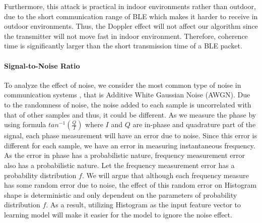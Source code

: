 Furthermore, this attack is practical in indoor environments rather than outdoor, due to the short communication range of BLE which makes it harder to receive in outdoor environments. Thus, the Doppler effect will not affect our algorithm since the transmitter will not move fast in indoor environment. Therefore, coherence time is significantly larger than the short transmission time of a BLE packet.

\paragraph{Signal-to-Noise Ratio} To analyze the effect of noise, we consider the most common type of noise in communication systems , that is Additive White Gaussian Noise (AWGN). Due to the randomness of noise, the noise added to each sample is uncorrelated with that of other samples and thus, it could be different. As we measure the phase by using formula $tan^{-1}(\frac{Q}{I})$ where $I$ and $Q$ are in-phase and quadrature  part of the signal, each phase measurement will have an error due to noise. Since this error is different for each sample, we have an error in measuring instantaneous frequency. As the error in phase has a probabilistic nature, frequency measurement error also has a probabilistic nature. Let the frequency measurement error has a probability distribution $f$. We will argue that although each frequency measure has some random error due to noise, the effect of this random error on Histogram shape is deterministic and only dependent on the parameters of probability distribution $f$. As a result, utilizing Histogram as the input feature vector to learning model will make it easier for the model to ignore the noise effect.

